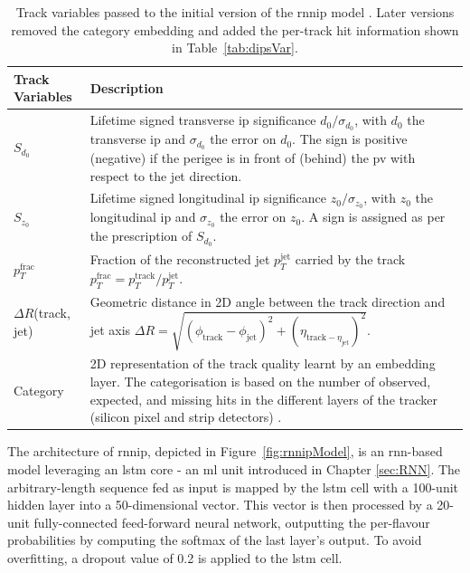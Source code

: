 \begin{table}[h!]
  \begin{center}
      \begin{tabular}{C{3cm}|C{13cm}} 
      	 \hline \hline
          Track Variables & Description  \\ \hline \hline
          $S_{d_0}$      & Lifetime signed transverse \gls{ip} significance $d_0 / \sigma_{d_0}$, with $d_0$ the transverse \gls{ip} and $\sigma_{d_0}$ the error on $d_0$. The sign is positive (negative) if the perigee is in front of (behind) the \gls{pv} with respect to the jet direction. \\ \hline
          $S_{z_0}$      & Lifetime signed longitudinal \gls{ip} significance $z_0 / \sigma_{z_0}$, with $z_0$ the longitudinal \gls{ip} and $\sigma_{z_0}$ the error on $z_0$. A sign is assigned as per the prescription of $S_{d_0}$. \\ \hline
          $p_T^{\textrm{frac}}$   & Fraction of the reconstructed jet $p_T^{\textrm{jet}}$ carried by the track $p_T^{\textrm{frac}} = p_T^{\textrm{track}} / p_T^{\textrm{jet}}$. \\ \hline
          $\Delta R$(track, jet) & Geometric distance in 2D angle between the track direction and jet axis $\Delta R = \sqrt{(\phi_{\textrm{track}} - \phi_{\textrm{jet}})^2 + (\eta_{\textrm{track} - \eta_{\textrm{jet}}})^2}$. \\ \hline
          Category       & 2D representation of the track quality learnt by an embedding layer. The categorisation is based on the number of observed, expected, and missing hits in the different layers of the tracker (silicon pixel and strip detectors) \cite{ATL-PHYS-PUB-2015-022}.  \\ \hline
      \end{tabular}
    \caption{Track variables passed to the initial version of the \gls{rnnip} model \cite{ATL-PHYS-PUB-2017-003}. Later versions removed the category embedding and added the per-track hit information shown in Table~\ref{tab:dipsVar}.}
    \label{tab:rnnipVar}
  \end{center}
\end{table}

The architecture of \gls{rnnip}, depicted in Figure~\ref{fig:rnnipModel}, is an \gls{rnn}-based model leveraging an \gls{lstm} core - an \gls{ml} unit introduced in Chapter \ref{sec:RNN}. The arbitrary-length sequence fed as input is mapped by the \gls{lstm} cell with a 100-unit hidden layer into a 50-dimensional vector. This vector is then processed by a 20-unit fully-connected feed-forward neural network, outputting the per-flavour probabilities by computing the softmax of the last layer's output. To avoid overfitting, a dropout value of 0.2 is applied to the \gls{lstm} cell. \\


